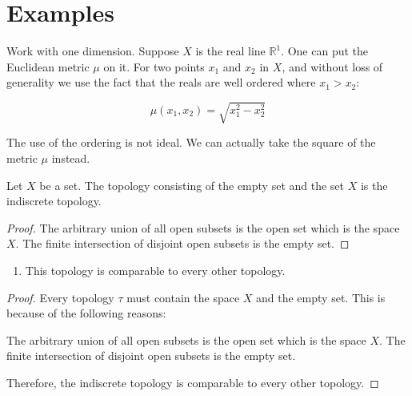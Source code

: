 \section{Examples}

\begin{example}
    \label{example-euclidean-metric}
    Work with one dimension.
    Suppose $X$ is the real line $\mathbb{R}^1$.
    One can put the Euclidean metric $\mu$ on it.
    For two points $x_1$ and $x_2$ in $X$, 
    and without loss of generality we use the fact that
    the reals are well ordered where $x_1 > x_2$:

    \begin{equation}
        \mu(x_1, x_2) = \sqrt{x_1^2 - x_2^2}
    \end{equation}

    The use of the ordering is not ideal.
    We can actually take the square of the metric $\mu$
    instead.
\end{example}

\begin{example}
    \label{example-indiscrete}
    Let $X$ be a set.
    The topology consisting of the empty set and the set $X$ is the indiscrete topology.
\end{example}

\begin{proof}
    The arbitrary union of all open subsets is the open set which is the space $X$.
    The finite intersection of disjoint open subsets is the empty set.
\end{proof}

\begin{remark}
    \label{remarks-indiscrete}
    \begin{enumerate}
        \item This topology is comparable to every other topology.
    \end{enumerate}
\end{remark}

\begin{proof}
    Every topology $\tau$ must contain the space $X$ and the empty set. This is because of the following reasons:

    The arbitrary union of all open subsets is the open set which is the space $X$.
    The finite intersection of disjoint open subsets is the empty set.

    Therefore, the indiscrete topology is comparable to every other topology.
\end{proof}

